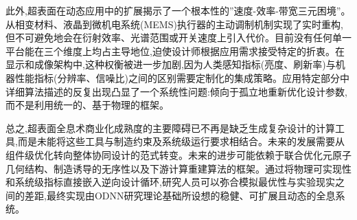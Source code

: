 \documentclass[11pt]{article}
\begin{document}
此外,超表面在动态应用中的扩展揭示了一个根本性的''速度-效率-带宽三元困境''。从相变材料、液晶到微机电系统(MEMS)执行器的主动调制机制实现了实时重构,但不可避免地会在衍射效率、光谱范围或开关速度上引入代价。目前没有任何单一平台能在三个维度上均占主导地位,迫使设计师根据应用需求接受特定的折衷。在显示和成像架构中,这种权衡被进一步加剧,因为人类感知指标(亮度、刷新率)与机器性能指标(分辨率、信噪比)之间的区别需要定制化的集成策略。应用特定部分中详细算法描述的反复出现凸显了一个系统性问题:倾向于孤立地重新优化设计参数,而不是利用统一的、基于物理的框架。

总之,超表面全息术商业化成熟度的主要障碍已不再是缺乏生成复杂设计的计算工具,而是未能将这些工具与制造约束及系统级运行要求相结合。未来的发展需要从组件级优化转向整体协同设计的范式转变。未来的进步可能依赖于联合优化元原子几何结构、制造诱导的无序性以及下游计算重建算法的框架。通过将物理可实现性和系统级指标直接嵌入逆向设计循环,研究人员可以弥合模拟最优性与实验现实之间的差距,最终实现由ODNN研究理论基础所设想的稳健、可扩展且动态的全息系统。



\end{document}
